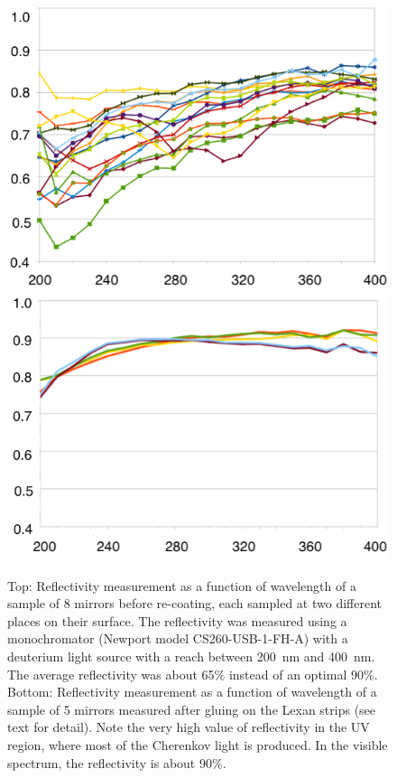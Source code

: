 \begin{figure}
\centering
	\includegraphics[width=0.99\columnwidth, height=0.7\columnwidth]{img/mirrorsReflectivityBefore.png}
	\includegraphics[width=0.99\columnwidth, height=0.7\columnwidth]{img/mirrorsReflectivityAfter.png}
	\caption{Top: Reflectivity measurement as a function of wavelength of a sample of 8 mirrors before re-coating,
            each sampled at two different places on their surface. The reflectivity
			was measured using a monochromator (Newport model CS260-USB-1-FH-A) with a deuterium light source with a reach
            between 200~nm and 400~nm. The average reflectivity was about 65$\%$ instead of an optimal 90$\%$.
			Bottom: Reflectivity measurement as a function of wavelength of a sample of 5 mirrors measured
            after gluing on the Lexan strips (see text for detail).
            Note the very high value of reflectivity in the UV region, where most of the Cherenkov light is produced.
            In the visible spectrum, the reflectivity is about 90$\%$.}
	\label{fig:reflectivityBeforeAndAfter}
\end{figure}


